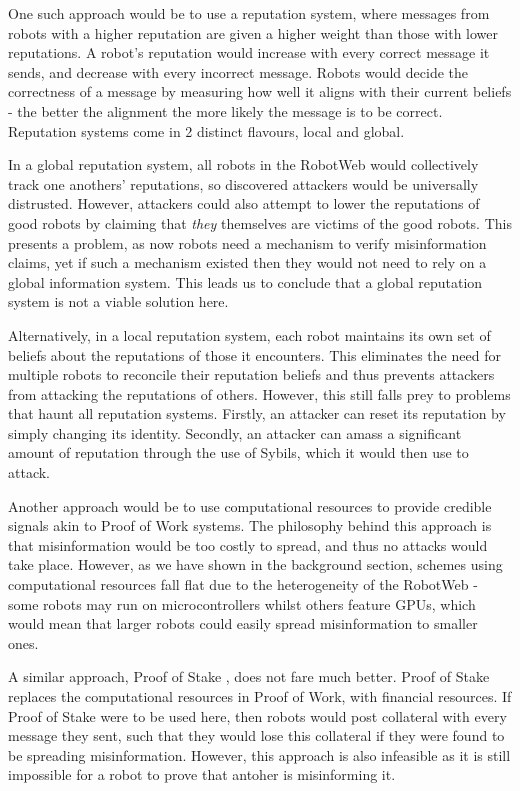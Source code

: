 One such approach would be to use a reputation system, where messages from robots with a higher reputation are given a higher weight than those with lower reputations. A robot's reputation would increase with every correct message it sends, and decrease with every incorrect message. Robots would decide the correctness of a message by measuring how well it aligns with their current beliefs - the better the alignment the more likely the message is to be correct. Reputation systems come in 2 distinct flavours, local and global. 

In a global reputation system, all robots in the RobotWeb would collectively track one anothers' reputations, so discovered attackers would be universally distrusted. However, attackers could also attempt to lower the reputations of good robots by claiming that \textit{they} themselves are victims of the good robots. This presents a problem, as now robots need a mechanism to verify misinformation claims, yet if such a mechanism existed then they would not need to rely on a global information system. This leads us to conclude that a global reputation system is not a viable solution here.

Alternatively, in a local reputation system, each robot maintains its own set of beliefs about the reputations of those it encounters. This eliminates the need for multiple robots to reconcile their reputation beliefs and thus prevents attackers from attacking the reputations of others. However, this still falls prey to problems that haunt all reputation systems. Firstly, an attacker can reset its reputation by simply changing its identity. Secondly, an attacker can amass a significant amount of reputation through the use of Sybils, which it would then use to attack.

Another approach would be to use computational resources to provide credible signals akin to Proof of Work systems. The philosophy behind this approach is that misinformation would be too costly to spread, and thus no attacks would take place. However, as we have shown in the background section, schemes using computational resources fall flat due to the heterogeneity of the RobotWeb - some robots may run on microcontrollers whilst others feature GPUs, which would mean that larger robots could easily spread misinformation to smaller ones.

A similar approach, Proof of Stake \cite{pos}, does not fare much better. Proof of Stake replaces the computational resources in Proof of Work, with financial resources. If Proof of Stake were to be used here, then robots would post collateral with every message they sent, such that they would lose this collateral if they were found to be spreading misinformation. However, this approach is also infeasible as it is still impossible for a robot to prove that antoher is misinforming it.

